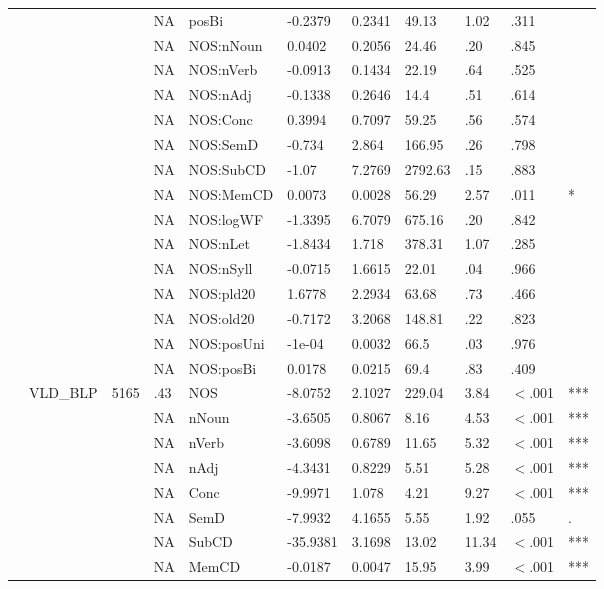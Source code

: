 \begin{table}[ht]
\begin{tabular}{lllllllllll}
   &  &  & NA & posBi & -0.2379 & 0.2341 & 49.13 & 1.02 & .311 &   \\ 
   &  &  & NA & NOS:nNoun & 0.0402 & 0.2056 & 24.46 & .20 & .845 &   \\ 
   &  &  & NA & NOS:nVerb & -0.0913 & 0.1434 & 22.19 & .64 & .525 &   \\ 
   &  &  & NA & NOS:nAdj & -0.1338 & 0.2646 & 14.4 & .51 & .614 &   \\ 
   &  &  & NA & NOS:Conc & 0.3994 & 0.7097 & 59.25 & .56 & .574 &   \\ 
   &  &  & NA & NOS:SemD & -0.734 & 2.864 & 166.95 & .26 & .798 &   \\ 
   &  &  & NA & NOS:SubCD & -1.07 & 7.2769 & 2792.63 & .15 & .883 &   \\ 
   &  &  & NA & NOS:MemCD & 0.0073 & 0.0028 & 56.29 & 2.57 & .011 & * \\ 
   &  &  & NA & NOS:logWF & -1.3395 & 6.7079 & 675.16 & .20 & .842 &   \\ 
   &  &  & NA & NOS:nLet & -1.8434 & 1.718 & 378.31 & 1.07 & .285 &   \\ 
   &  &  & NA & NOS:nSyll & -0.0715 & 1.6615 & 22.01 & .04 & .966 &   \\ 
   &  &  & NA & NOS:pld20 & 1.6778 & 2.2934 & 63.68 & .73 & .466 &   \\ 
   &  &  & NA & NOS:old20 & -0.7172 & 3.2068 & 148.81 & .22 & .823 &   \\ 
   &  &  & NA & NOS:posUni & -1e-04 & 0.0032 & 66.5 & .03 & .976 &   \\ 
   &  &  & NA & NOS:posBi & 0.0178 & 0.0215 & 69.4 & .83 & .409 &   \\ 
   & VLD\_BLP & 5165 & .43 & NOS & -8.0752 & 2.1027 & 229.04 & 3.84 & $<$.001 & *** \\ 
   &  &  & NA & nNoun & -3.6505 & 0.8067 & 8.16 & 4.53 & $<$.001 & *** \\ 
   &  &  & NA & nVerb & -3.6098 & 0.6789 & 11.65 & 5.32 & $<$.001 & *** \\ 
   &  &  & NA & nAdj & -4.3431 & 0.8229 & 5.51 & 5.28 & $<$.001 & *** \\ 
   &  &  & NA & Conc & -9.9971 & 1.078 & 4.21 & 9.27 & $<$.001 & *** \\ 
   &  &  & NA & SemD & -7.9932 & 4.1655 & 5.55 & 1.92 & .055 & . \\ 
   &  &  & NA & SubCD & -35.9381 & 3.1698 & 13.02 & 11.34 & $<$.001 & *** \\ 
   &  &  & NA & MemCD & -0.0187 & 0.0047 & 15.95 & 3.99 & $<$.001 & *** \\ 

\end{tabular}
\end{table}
